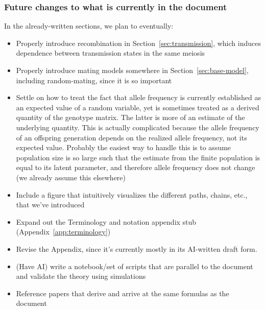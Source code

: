 \documentclass[12pt]{article}
\numberwithin{equation}{section}
\begin{document}
\subsubsection{Future changes to what is currently in the document}
In the already-written sections, we plan to eventually:
\begin{itemize}
    \item Properly introduce recombination in Section~\ref{sec:transmission}, which induces dependence between transmission states in the same meiosis
    \item Properly introduce mating models somewhere in Section~\ref{sec:base-model}, including random-mating, since it is so important
    \item Settle on how to treat the fact that allele frequency is currently established as an expected value of a random variable, yet is sometimes treated as a derived quantity of the genotype matrix.
    The latter is more of an estimate of the underlying quantity.
    This is actually complicated because the allele frequency of an offspring generation depends on the realized allele frequency, not its expected value.
    Probably the easiest way to handle this is to assume population size is so large such that the estimate from the finite population is equal to its latent parameter, and therefore allele frequency does not change (we already assume this elsewhere)
    \item Include a figure that intuitively visualizes the different paths, chains, etc., that we've introduced
    \item Expand out the Terminology and notation appendix stub (Appendix~\ref{app:terminology})
    \item Revise the Appendix, since it's currently mostly in its AI-written draft form.
    \item (Have AI) write a notebook/set of scripts that are parallel to the document and validate the theory using simulations
    \item Reference papers that derive and arrive at the same formulas as the document 
\end{itemize}
\end{document}
